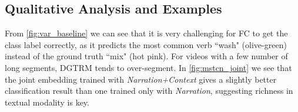 \subsection{Qualitative Analysis and Examples}

From \ref{fig:var_baseline} we can see that it is very challenging for FC to get the class label correctly, as it predicts the most common verb ``wash" (olive-green) instead of the ground truth ``mix" (hot pink). For videos with a few number of long segments, DGTRM tends to over-segment. In \ref{fig:mstcn_joint} we see that the joint embedding trained with \textit{Narration+Context} gives a slightly better classification result than one trained only with \textit{Narration}, suggesting richness in textual modality is key.

